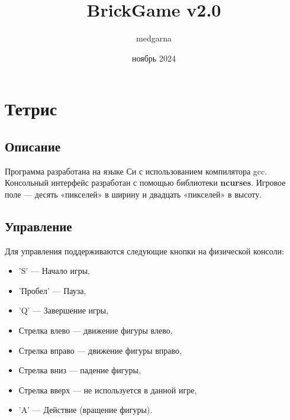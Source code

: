 \documentclass{article}
\title{BrickGame v2.0}
\author{medgarna}
\date{ноябрь 2024}
\begin{document}
\maketitle

\section{Тетрис}
\subsection{Описание}
{\small Программа разработана на языке Си с использованием компилятора gcc. Консольный интерфейс разработан с помощью библиотеки \textbf{ncurses}. 
Игровое поле — десять «пикселей» в ширину и двадцать «пикселей» в высоту.}

\subsection{Управление}
Для управления поддерживаются следующие кнопки на физической консоли:
\begin{itemize}
    \item 'S' — Начало игры,
    \item 'Пробел' — Пауза,
    \item 'Q' — Завершение игры,
    \item Стрелка влево — движение фигуры влево,
    \item Стрелка вправо — движение фигуры вправо,
    \item Стрелка вниз — падение фигуры,
    \item Стрелка вверх — не используется в данной игре,
    \item 'A' — Действие (вращение фигуры).
\end{itemize}
\end{document}
